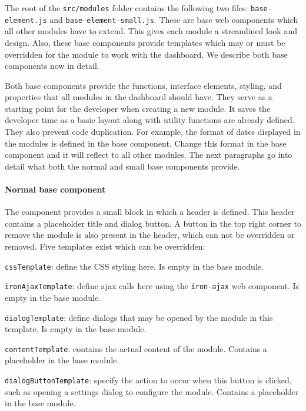         The root of the \texttt{src/modules} folder contains the following two files: \texttt{base-
        element.js} and \texttt{base-element-small.js}. These are base web components which all other modules have to extend. This gives each module a streamlined look and design. Also, these base components provide templates which may or must be overridden for the module to work with the dashboard. We describe both base components now in detail.

            \label{base_components}

            Both base components provide the functions, interface elements, styling, and properties that all modules in the dashboard should have. They serve as a starting point for the developer when creating a new module. It saves the developer time as a basic layout along with utility functions are already defined. They also prevent code duplication. For example, the format of dates displayed in the modules is defined in the base component. Change this format in the base component and it will reflect to all other modules. The next paragraphs go into detail what both the normal and small base components provide.

            \paragraph{Normal base component} The component provides a small block in which a header is defined. This header contains a placeholder title and dialog button. A button in the top right corner to remove the module is also present in the header, which can not be overridden or removed. Five templates exist which can be overridden: 
            \vspace{-6pt}
            \begin{myenumerate}
                \item \texttt{cssTemplate}: define the CSS styling here. Is empty in the base module.
                \item \texttt{ironAjaxTemplate}: define ajax calls here using the \texttt{iron-ajax} web component. Is empty in the base module.
                \item \texttt{dialogTemplate}: define dialogs that may be opened by the module in this template. Is empty in the base module.
                \item \texttt{contentTemplate}: contains the actual content of the module. Contains a placeholder in the base module.
                \item \texttt{dialogButtonTemplate}: specify the action to occur when this button is clicked, such as opening a settings dialog to configure the module. Contains a placeholder in the base module.
            \end{myenumerate}

